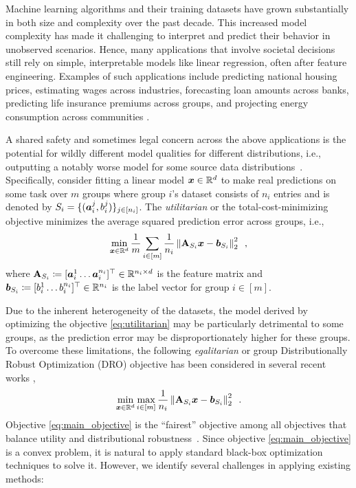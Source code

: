Machine learning algorithms and their training datasets have grown substantially in both size and complexity over the past decade. This increased model complexity has made it challenging to interpret and predict their behavior in unobserved scenarios. Hence, many applications that involve societal decisions still rely on simple, interpretable models like linear regression, often after feature engineering. Examples of such applications include predicting national housing prices, estimating wages across industries, forecasting loan amounts across banks, predicting life insurance premiums across groups, and projecting energy consumption across communities \citep{cohen2024fairness}. 

A shared safety and sometimes legal concern across the above applications is the potential for wildly different model qualities for different distributions, i.e., outputting a notably worse model for some source data distributions~\citep{data2014seizing, barocas2016big,hardt2016equality,veale2018fairness,selbst2019fairness,berk2021fairness, corbett2023measure,chouldechova2016fair,kleinberg2018algorithmic, agarwal2019fair,cohen2024fairness,svwz24}. Specifically, consider fitting a linear model $\bm{x}\in\mathbb{R}^d$ to make real predictions on some task over $m$ groups where group $i$'s dataset consists of $n_i$ entries and is denoted by $S_i=\{(\bm{a}_i^j, b_i^j)\}_{j\in [n_i]}$. The \textit{utilitarian} or the total-cost-minimizing objective minimizes the average squared prediction error across groups, i.e.,        
\begin{align}
    \min_{\bm{x}\in\mathbb{R}^d}\frac{1}{m}\sum_{i\in[m]}\frac{1}{n_i}\left\lVert \mathbf{A}_{S_i}\bm{x}-\bm{b}_{S_i} \right\rVert_2^2\enspace,\label{eq:utilitarian}
\end{align}
where $\mA_{S_i} \coloneqq [\va_i^1 \dots \va_i^{n_i}]^{\top}\in \R^{n_i \times d}$ is the feature matrix and $\bm{b}_{S_i} \coloneqq [b_i^1 \dots b_i^{n_i}]^{\top} \in \mathbb{R}^{n_i}$ is the label vector for group $i\in[m]$. 

Due to the inherent heterogeneity of the datasets, the model derived by optimizing the objective \eqref{eq:utilitarian} may be particularly detrimental to some groups, as the prediction error may be disproportionately higher for these groups. To overcome these limitations, the following \textit{egalitarian} or group Distributionally Robust Optimization (DRO) objective  has been considered in several recent works \citep{ben2013robust, duchi2016statistics, sagawa2019distributionally, levy2020large, soma2022optimal,aakmrz22,svwz24},
\begin{align}
    \min_{\bm{x}\in\mathbb{R}^d} \max_{i\in[m]}\frac{1}{n_i}\left\lVert \mathbf{A}_{S_i}\bm{x}-\bm{b}_{S_i} \right\rVert_2^2\enspace.\label{eq:main_objective}
\end{align}
Objective \ref{eq:main_objective} is the ``fairest'' objective among all objectives that balance utility and distributional robustness~\citep{kleinberg2018algorithmic,chouldechova2018frontiers,asadpour2022sequential,chen2022fair,rahmattalabi2019exploring,golrezaei2024online}. Since objective \ref{eq:main_objective} is a convex problem, it is natural to apply standard black-box optimization techniques to solve it. However, we identify several challenges in applying existing methods:
